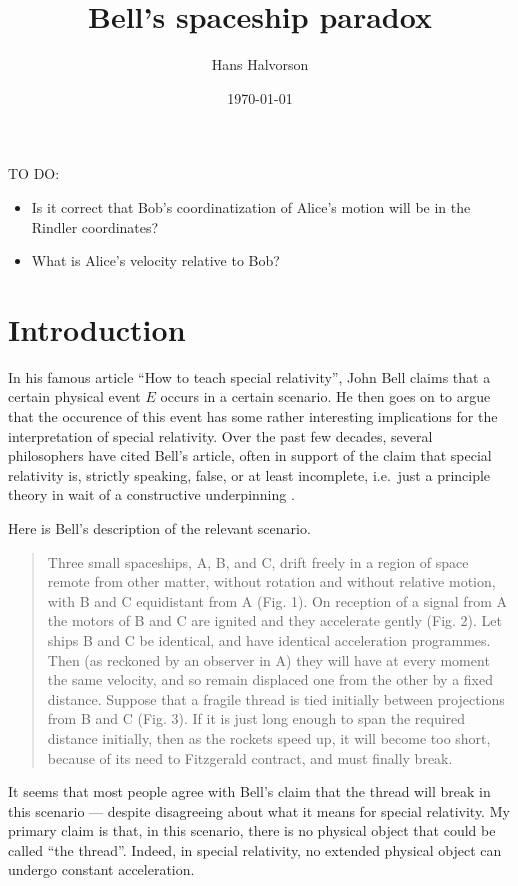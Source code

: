 \documentclass[tikz,border=10pt,fleqn]{article}
\title{Bell's spaceship paradox}
\author{Hans Halvorson}
\date{\today}
\theoremstyle{definition}
\begin{document}

\maketitle

TO DO:
\begin{itemize}
\item Is it correct that Bob's coordinatization of Alice's motion will
  be in the Rindler coordinates?
\item What is Alice's velocity relative to Bob?   
\end{itemize}

\section{Introduction}

In his famous article ``How to teach special relativity'', John Bell
\citeyearpar{bell} claims that a certain physical event $E$ occurs in
a certain scenario. He then goes on to argue that the occurence of
this event has some rather interesting implications for the
interpretation of special relativity. Over the past few decades,
several philosophers have cited Bell's article, often in support of
the claim that special relativity is, strictly speaking, false, or at
least incomplete, i.e.\ just a principle theory in wait of a
constructive underpinning \citep[see][]{brown1999,brown2004}.

Here is Bell's description of the relevant scenario.
\begin{quote} Three small spaceships, A, B, and C, drift freely in a
  region of space remote from other matter, without rotation and
  without relative motion, with B and C equidistant from A (Fig. 1).
  On reception of a signal from A the motors of B and C are ignited
  and they accelerate gently (Fig. 2).  Let ships B and C be
  identical, and have identical acceleration programmes. Then (as
  reckoned by an observer in A) they will have at every moment the
  same velocity, and so remain displaced one from the other by a fixed
  distance. Suppose that a fragile thread is tied initially between
  projections from B and C (Fig. 3). If it is just long enough to span
  the required distance initially, then as the rockets speed up, it
  will become too short, because of its need to Fitzgerald contract,
  and must finally break. \end{quote} It seems that most people agree
with Bell's claim that the thread will break in this scenario ---
despite disagreeing about what it means for special relativity. My
primary claim is that, in this scenario, there is no physical object
that could be called ``the thread''. Indeed, in special relativity, no
extended physical object can undergo constant acceleration.
\end{document}

